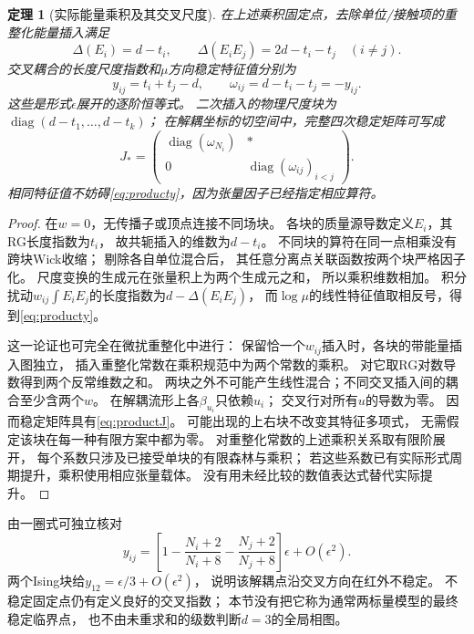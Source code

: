 \documentclass[11pt,a4paper]{ctexart}
\theoremstyle{cnplain}\newtheorem{theorem}{定理}[section]
\theoremstyle{definition}\newtheorem{definition}[theorem]{定义}
\theoremstyle{remark}\newtheorem{remark}[theorem]{注}
\begin{document}
\begin{theorem}[实际能量乘积及其交叉尺度]\label{thm:productcrossover}
在上述乘积固定点，去除单位/接触项的重整化能量插入满足
\[
 \Delta(E_i)=d-t_i,\qquad
 \Delta(E_iE_j)=2d-t_i-t_j\quad(i\ne j).
\]
交叉耦合的长度尺度指数和$\mu$方向稳定特征值分别为
\[
 \boxed{y_{ij}=t_i+t_j-d,\qquad
        \omega_{ij}=d-t_i-t_j=-y_{ij}.}              \tag{PC4}\label{eq:producty}
\]
这些是形式$\epsilon$展开的逐阶恒等式。
二次插入的物理尺度块为
$\operatorname{diag}(d-t_1,\ldots,d-t_k)$；
在解耦坐标的切空间中，完整四次稳定矩阵可写成
\[
 J_*=
 \begin{pmatrix}
  \operatorname{diag}(\omega_{N_i})& *\\
  0&\operatorname{diag}(\omega_{ij})_{i<j}
 \end{pmatrix}.                                        \tag{PC5}\label{eq:productJ}
\]
相同特征值不妨碍\eqref{eq:producty}，因为张量因子已经指定相应算符。
\end{theorem}
\begin{proof}
在$w=0$，无传播子或顶点连接不同场块。
各块的质量源导数定义$E_i$，其RG长度指数为$t_i$，
故共轭插入的维数为$d-t_i$。
不同块的算符在同一点相乘没有跨块Wick收缩；
剔除各自单位混合后，
其任意分离点关联函数按两个块严格因子化。
尺度变换的生成元在张量积上为两个生成元之和，
所以乘积维数相加。
积分扰动$w_{ij}\int E_iE_j$的长度指数为$d-\Delta(E_iE_j)$，
而$\log\mu$的线性特征值取相反号，得到\eqref{eq:producty}。

这一论证也可完全在微扰重整化中进行：
保留恰一个$w_{ij}$插入时，各块的带能量插入图独立，
插入重整化常数在乘积规范中为两个常数的乘积。
对它取RG对数导数得到两个反常维数之和。
两块之外不可能产生线性混合；不同交叉插入间的耦合至少含两个$w$。
在解耦流形上各$\beta_{u_i}$只依赖$u_i$；
交叉行对所有$u$的导数为零。
因而稳定矩阵具有\eqref{eq:productJ}。
可能出现的上右块不改变其特征多项式，
无需假定该块在每一种有限方案中都为零。
对重整化常数的上述乘积关系取有限阶展开，
每个系数只涉及已接受单块的有限森林与乘积；
若这些系数已有实际形式周期提升，乘积使用相应张量载体。
没有用未经比较的数值表达式替代实际提升。
\end{proof}

由一圈式可独立核对
\[
 y_{ij}
 =\left[1-\frac{N_i+2}{N_i+8}
          -\frac{N_j+2}{N_j+8}\right]\epsilon+O(\epsilon^2).
                                                               \tag{PC6}
\]
两个Ising块给$y_{12}=\epsilon/3+O(\epsilon^2)$，
说明该解耦点沿交叉方向在红外不稳定。
不稳定固定点仍有定义良好的交叉指数；
本节没有把它称为通常两标量模型的最终稳定临界点，
也不由未重求和的级数判断$d=3$的全局相图。
\end{document}
